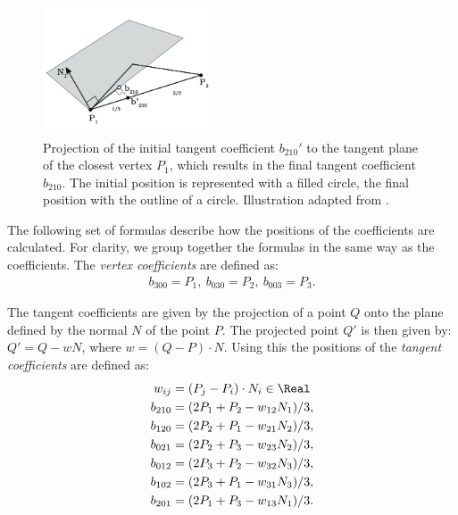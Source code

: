	\begin{figure}
		\centering
		\includegraphics[width=0.45\textwidth]{./content/img/method/geometry_computation.png}
		\caption{Projection of the initial tangent coefficient $b_{210}'$ to the tangent plane of the closest vertex $P_1$, which results in the final tangent coefficient $b_{210}$. The initial position is represented with a filled circle, the final position with the outline of a circle. Illustration adapted from \textcite{vlachos2001curved}.}
		\label{fig:method:geometry_tangent_projection.png}
	\end{figure}

	The following set of formulas describe how the positions of the coefficients are calculated. For clarity, we group together the formulas in the same way as the coefficients. The \textit{vertex coefficients} are defined as:
	\begin{align}\label{eq:method:vertex_coefficients}
		b_{300} = P_1,\ b_{030} = P_2,\ b_{003} = P_3.
	\end{align}

	The tangent coefficients are given by the projection of a point $Q$ onto the plane defined by the normal $N$ of the point $P$. The projected point $Q'$ is then given by: $Q' = Q - wN$, where $w = (Q - P) \cdot N$. Using this the positions of the \textit{tangent coefficients} are defined as:
	\begin{align}\label{eq:method:tangent_coefficients}
		w_{ij} = {}& (P_j - P_i) \cdot N_i \in \Real \nonumber\\
		b_{210} = {}& (2 P_1 + P_2 - w_{12}N_1) / 3,\nonumber\\
		b_{120} = {}& (2 P_2 + P_1 - w_{21}N_2) / 3,\nonumber\\
		b_{021} = {}& (2 P_2 + P_3 - w_{23}N_2) / 3, \\
		b_{012} = {}& (2 P_3 + P_2 - w_{32}N_3) / 3,\nonumber\\
		b_{102} = {}& (2 P_3 + P_1 - w_{31}N_3) / 3,\nonumber\\
		b_{201} = {}& (2 P_1 + P_3 - w_{13}N_1) / 3. \nonumber
	\end{align}

